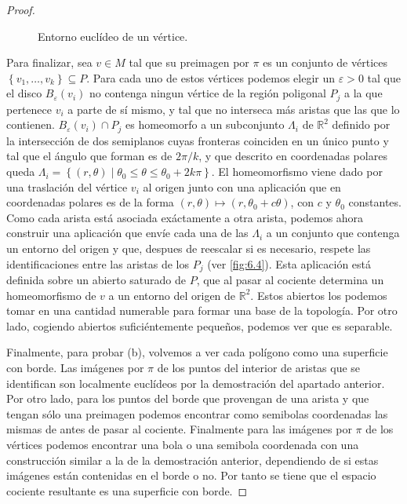 \documentclass[10pt]{report}
\newcommand{\R}{\mathbb{R}}
\theoremstyle{definition}
\begin{document}
\begin{proof}
\begin{figure}[t]
\caption{Entorno euclídeo de un vértice.\label{fig:6.4}}
\end{figure}

Para finalizar, sea $v\in M$ tal que su preimagen por $\pi$ es un conjunto de vértices $\left\{v_1,\dots ,v_k\right\} \subseteq P$. Para cada uno de estos vértices podemos elegir un $\varepsilon>0$ tal que el disco $B_{\varepsilon}(v_i)$ no contenga ningun vértice de la región poligonal $P_j$ a la que pertenece $v_i$ a parte de sí mismo, y tal que no interseca más aristas que las que lo contienen. $B_{\varepsilon}(v_i)\cap P_j$ es homeomorfo a un subconjunto $\Lambda_i$ de $\R^2$ definido por la intersección de dos semiplanos cuyas fronteras coinciden en un único punto y tal que el ángulo que forman es de $2\pi /k$, y que descrito en coordenadas polares queda $\Lambda_i =\left\{ (r,\theta ) \mid \theta_0 \leq \theta \leq \theta_0 + 2k\pi \right\}$. El homeomorfismo viene dado por una traslación del vértice $v_i$ al origen junto con una aplicación que en coordenadas polares es de la forma $(r,\theta ) \mapsto (r,\theta_0 +c\theta )$, con $c$ y $\theta_0$ constantes. Como cada arista está asociada exáctamente a otra arista, podemos ahora construir una aplicación que envíe cada una de las $\Lambda_i$ a un conjunto que contenga un entorno del origen y que, despues de reescalar si es necesario, respete las identificaciones entre las aristas de los $P_j$ (ver \autoref{fig:6.4}). Esta aplicación está definida sobre un abierto saturado de $P$, que al pasar al cociente determina un homeomorfismo de $v$ a un entorno del origen de $\R^2$. Estos abiertos los podemos tomar en una cantidad numerable para formar una base de la topología. Por otro lado, cogiendo abiertos suficiéntemente pequeños, podemos ver que es separable.%

Finalmente, para probar (b), volvemos a ver cada polígono como una superficie con borde. Las imágenes por $\pi$ de los puntos del interior de aristas que se identifican son localmente euclídeos por la demostración del apartado anterior. Por otro lado, para los puntos del borde que provengan de una arista y que tengan sólo una preimagen podemos encontrar como semibolas coordenadas las mismas de antes de pasar al cociente. Finalmente para las imágenes por $\pi$ de los vértices podemos encontrar una bola o una semibola coordenada con una construcción similar a la de la demostración anterior, dependiendo de si estas imágenes están contenidas en el borde o no. Por tanto se tiene que el espacio cociente resultante es una superficie con borde. %
\end{proof}
\end{document}
